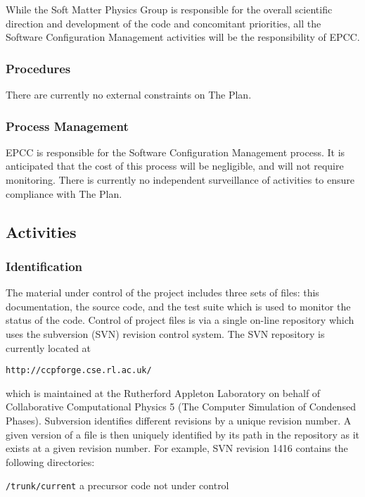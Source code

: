 While the Soft Matter Physics Group is responsible for the overall
scientific direction and development of the code and concomitant
priorities, all
the Software Configuration Management activities will be the
responsibility of EPCC.

\subsubsection{Procedures}

There are currently no external constraints on The Plan.

\subsubsection{Process Management}

EPCC is responsible for the Software Configuration Management process.
It is anticipated that the cost of this process will be negligible, and
will not require monitoring. There is currently no independent
surveillance of activities to ensure compliance with The Plan.

\subsection{Activities}

\subsubsection{Identification}

The material under control of the project includes three sets of files:
this documentation, the source code, and the test suite which is used
to monitor the status of the code.
Control of project files is via a single on-line repository which
uses the subversion (SVN) revision control system. The SVN repository
is currently located at

\texttt{http://ccpforge.cse.rl.ac.uk/}

which is maintained at the Rutherford Appleton Laboratory on behalf
of Collaborative Computational Physics 5 (The Computer Simulation of
Condensed Phases). Subversion identifies different revisions by a
unique revision number. A given version of a file is then uniquely
identified by its path in the repository as it exists at a given
revision number. For example, SVN revision 1416 contains the
following directories:

\texttt{/trunk/current} a precursor code not under control

